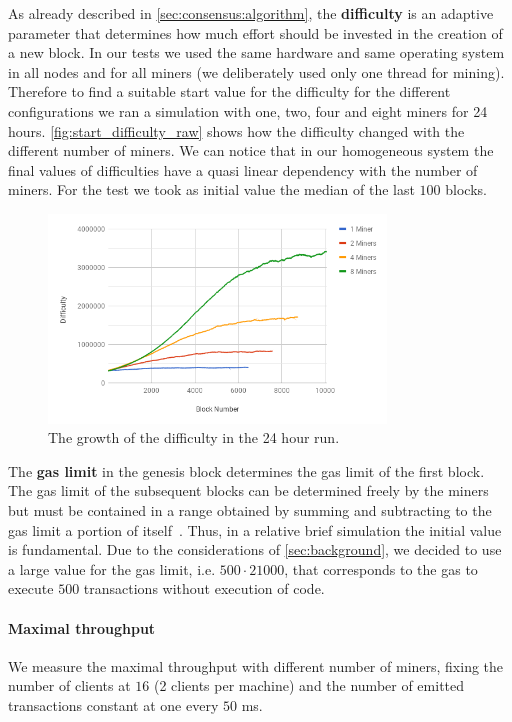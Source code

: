 As already described in \autoref{sec:consensus:algorithm}, the
\textbf{difficulty} is an adaptive parameter that determines how much effort
should be invested in the creation of a new block. In our tests we used the same
hardware and same operating system in all nodes and for all miners (we
deliberately used only one thread for mining). Therefore to find a suitable
start value for the difficulty for the different configurations we ran a
simulation with one, two, four and eight miners for 24 hours.
\autoref{fig:start_difficulty_raw} shows how the difficulty changed with the
different number of miners. We can notice that in our homogeneous system the
final values of difficulties have a quasi linear dependency with the number of
miners. For the test we took as initial value the median of the last $100$
blocks.
\begin{figure}
  \begin{center}
    \includegraphics[width=0.8\textwidth]{./res/img/start_difficulty_all.png}
    \caption{The growth of the difficulty in the 24 hour run.}
    \label{fig:start_difficulty_raw}
  \end{center}
\end{figure}

The \textbf{gas limit} in the genesis block determines the gas limit of the
first block. The gas limit of the subsequent blocks can be determined freely by
the miners but must be contained in a range obtained by summing and subtracting
to the gas limit a portion of itself~\cite{wood2018ethereum}. Thus, in a
relative brief simulation the initial value is fundamental. Due to the
considerations of \autoref{sec:background}, we decided to use a large value for
the gas limit, i.e. $500 \cdot 21000$, that corresponds to the gas to execute
$500$ transactions without execution of code.


\paragraph{Maximal throughput}
\label{sec:max-troughput}
We measure the maximal throughput with different number of miners, fixing the
number of clients at $16$ (2 clients per machine) and the number of emitted
transactions constant at one every $50$ ms. 

